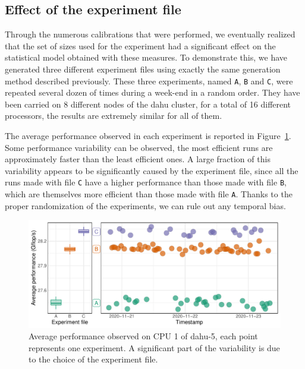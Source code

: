         \subsection{Effect of the experiment file}%
        \label{sub:effect_experiment_file}

            Through the numerous \dgemm calibrations that were performed, we eventually realized that the set of sizes
            used for the experiment had a significant effect on the statistical model obtained with these measures. To
            demonstrate this, we have generated three different experiment files using exactly the same generation
            method described previously. These three experiments, named \texttt{A}, \texttt{B} and \texttt{C}, were
            repeated several dozen of times during a week-end in a random order. They have been carried on 8 different
            nodes of the dahu cluster, for a total of 16 different processors, the results are extremely similar for all
            of them.

            The average \dgemm performance observed in each experiment is reported in
            Figure~\ref{fig:randomizing_sizes:expfile:average_perf}. Some performance variability can be observed, the
            most efficient runs are approximately  faster than the least efficient ones. A large
            fraction of this variability appears to be significantly caused by the experiment file, since all the runs
            made with file \texttt{C} have a higher performance than those made with file \texttt{B}, which are
            themselves more efficient than those made with file \texttt{A}. Thanks to the proper randomization of the
            experiments, we can rule out any temporal bias.

            \begin{figure}[htpb]
                \centering
                \includegraphics[width=\linewidth]{img/experiment/randomizing_sizes/expfile/average_performance.pdf}
                \caption{Average performance observed on CPU 1 of dahu-5, each point represents one experiment. A
                significant part of the variability is due to the choice of the experiment file.}%
                \label{fig:randomizing_sizes:expfile:average_perf}
            \end{figure}

